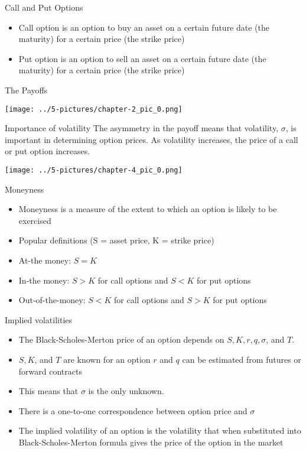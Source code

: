 \documentclass[11pt]{beamer}
\begin{document}
\begin{frame}{Call and Put Options}
\begin{itemize}
\item Call option is an option to buy an asset on a certain future date (the maturity) for a certain price (the strike price)
\item Put option is an option to sell an asset on a certain future date (the maturity) for a certain price (the strike price)
\end{itemize}
\end{frame}
\begin{frame}{The Payoffs}
	 
	\begin{center}
	\texttt{[image: ../5-pictures/chapter-2\_pic\_0.png]}
	\end{center}
\end{frame}
\begin{frame}{Importance of volatility}
The asymmetry in the payoff means that volatility, $\sigma$,  is important in determining option prices. As volatility increases, the price of a call or put option increases. 
	\begin{center}
	\texttt{[image: ../5-pictures/chapter-4\_pic\_0.png]}
	\end{center}

\end{frame}
\begin{frame}{Moneyness}
	\begin{itemize}
		\item Moneyness is a measure of the extent to which an option is likely to be exercised
		\item Popular definitions (S = asset price, K = strike price)
		\item At-the money: $S = K$
		\item In-the money: $S > K$ for call options and $S<K$ for put options
		\item Out-of-the-money: $S<K$ for call options and $S>K$  for put options
	\end{itemize}
\end{frame}
\begin{frame}{Implied volatilities}
\begin{itemize}
\item The Black-Scholes-Merton price of an option depends on $S, K, r, q, \sigma$,  and $T$.
\item $S, K$, and $T$ are known for an option
$r$ and $q$ can be estimated from futures or forward contracts
\item This means that $\sigma$ is the only unknown.
\item There is a one-to-one correspondence between option price and $\sigma$
\item The implied volatility of an option is the volatility that when substituted into Black-Scholes-Merton formula gives the price of the option in the market
\end{itemize}
\end{frame}
\end{document}
